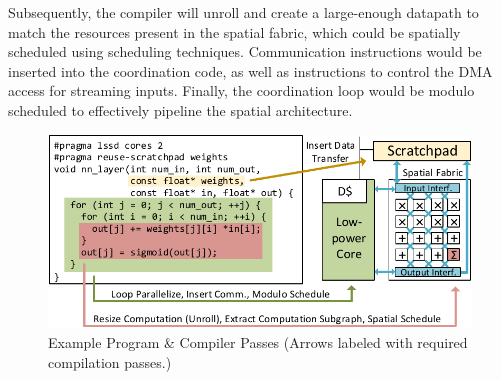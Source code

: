 Subsequently, the compiler will unroll and create a large-enough datapath to
match the resources present in the spatial fabric, which could be spatially
scheduled using scheduling techniques. Communication
instructions would be inserted into the coordination code, as well as
instructions to control the DMA access for streaming inputs.  Finally, the
coordination loop would be modulo scheduled to effectively pipeline the spatial
architecture.

\begin{figure}
  \includegraphics[width=\linewidth]{figs/example_prog.pdf}
  \vspace{-0.1in}
  \caption{Example Program \& Compiler Passes \newline
  \textnormal{\small (Arrows labeled with required compilation passes.)} 
}
  \label{fig:ex-prog}
\end{figure}

